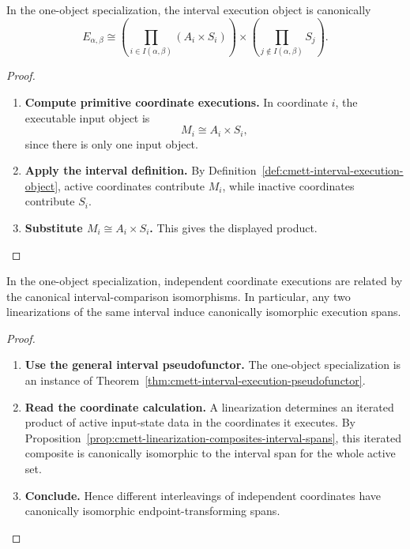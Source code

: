 \begin{proposition}
\label{prop:cmett-one-object-interval-execution-objects}
    In the one-object specialization, the interval execution object is
    canonically
    \[
        E_{\alpha,\beta}
        \cong
        \left(\prod_{i\in I(\alpha,\beta)}(A_i\times S_i)\right)
        \times
        \left(\prod_{j\notin I(\alpha,\beta)}S_j\right).
    \]
\end{proposition}

\begin{proof}
    \leavevmode
    \begin{enumerate}
        \item \textbf{Compute primitive coordinate executions.}
        In coordinate \(i\), the executable input object is
        \[
            M_i\cong A_i\times S_i,
        \]
        since there is only one input object.

        \item \textbf{Apply the interval definition.}
        By Definition~\ref{def:cmett-interval-execution-object}, active
        coordinates contribute \(M_i\), while inactive coordinates contribute
        \(S_i\).

        \item \textbf{Substitute \(M_i\cong A_i\times S_i\).}
        This gives the displayed product.
    \end{enumerate}
\end{proof}

\begin{proposition}
\label{prop:cmett-one-object-cubical-independence}
    In the one-object specialization, independent coordinate executions are
    related by the canonical interval-comparison isomorphisms. In particular,
    any two linearizations of the same interval induce canonically isomorphic
    execution spans.
\end{proposition}

\begin{proof}
    \leavevmode
    \begin{enumerate}
        \item \textbf{Use the general interval pseudofunctor.}
        The one-object specialization is an instance of
        Theorem~\ref{thm:cmett-interval-execution-pseudofunctor}.

        \item \textbf{Read the coordinate calculation.}
        A linearization determines an iterated product of active input-state
        data in the coordinates it executes. By
        Proposition~\ref{prop:cmett-linearization-composites-interval-spans},
        this iterated composite is canonically isomorphic to the interval span
        for the whole active set.

        \item \textbf{Conclude.}
        Hence different interleavings of independent coordinates have
        canonically isomorphic endpoint-transforming spans.
    \end{enumerate}
\end{proof}

